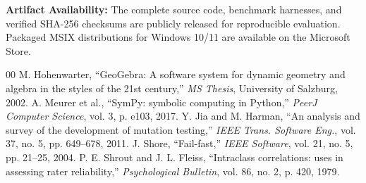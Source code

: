 \documentclass[conference]{IEEEtran}
\begin{document}
\textbf{Artifact Availability:} The complete source code, benchmark harnesses, and verified SHA-256 checksums are publicly released for reproducible evaluation. Packaged MSIX distributions for Windows 10/11 are available on the Microsoft Store.

\begin{thebibliography}{00}
 M. Hohenwarter, ``GeoGebra: A software system for dynamic geometry and algebra in the styles of the 21st century,'' \textit{MS Thesis}, University of Salzburg, 2002.
 A. Meurer et al., ``SymPy: symbolic computing in Python,'' \textit{PeerJ Computer Science}, vol. 3, p. e103, 2017.
 Y. Jia and M. Harman, ``An analysis and survey of the development of mutation testing,'' \textit{IEEE Trans. Software Eng.}, vol. 37, no. 5, pp. 649--678, 2011.
 J. Shore, ``Fail-fast,'' \textit{IEEE Software}, vol. 21, no. 5, pp. 21--25, 2004.
 P. E. Shrout and J. L. Fleiss, ``Intraclass correlations: uses in assessing rater reliability,'' \textit{Psychological Bulletin}, vol. 86, no. 2, p. 420, 1979.
\end{thebibliography}
\end{document}
